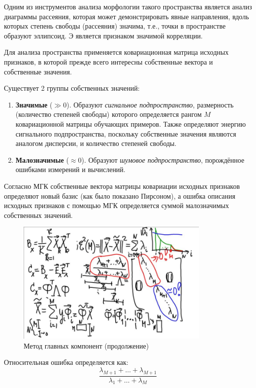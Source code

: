 \documentclass{article}
\numberwithin{equation}{subsection}
\begin{document}
Одним из инструментов анализа морфологии такого пространства является анализ диаграммы рассеяния,
которая может демонстрировать явные направления, вдоль которых степень свободы (рассеяния)
значима, т.е., точки в пространстве образуют эллипсоид. Э является признаком значимой корреляции.

Для анализа пространства применяется ковариационная матрица исходных признаков, в которой 
прежде всего интересны собственные вектора и собственные значения.

Существует 2 группы собственных значений: 

\begin{enumerate}
    \item \textbf{Значимые} ($\gg0$). Образуют \textit{сигнальное подпространство},
        размерность (количество степеней свободы) которого определяется рангом $M$ 
        ковариационной матрицы обучающих примеров.
        Также определяют энергию сигнального подпространства, поскольку собственные значения 
        являются аналогом дисперсии, и количество степеней свободы.
    \item \textbf{Малозначимые} ($\approx 0$). Образуют \textit{шумовое подпространство},
        порождённое ошибками измерений и вычислений.
\end{enumerate}

Согласно МГК собственные вектора матрицы ковариации исходных признаков определяют новый
базис (как было показано Пирсоном), а ошибка описания исходных признаков с помощью МГК
определяется суммой малозначимых собственных значений.

\begin{figure}[htbp]
    \centering
    \includegraphics[height=6cm]{hyperflat_12__1.jpeg}
    \caption{Метод главных компонент (продолжение)}
    \label{hyperflat_12__1}
\end{figure}

Относительная ошибка определяется как:
\begin{equation}
    \dfrac{\lambda_{M+1}+\dots+\lambda_{M+1}}{\lambda_1+\dots+\lambda_M}
\end{equation}
\end{document}
